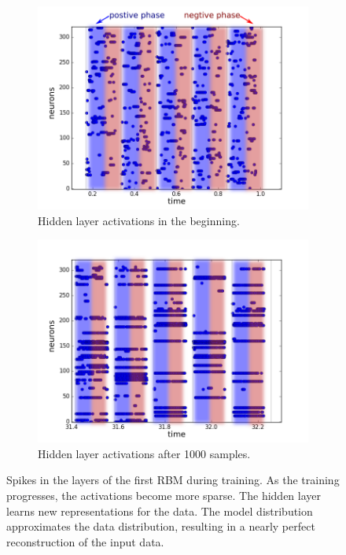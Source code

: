 \begin{figure}[h!]
	\begin{subfigure}[t]{.45\textwidth}
  		\centering
  		\includegraphics[width=.9\linewidth]{imgs/7x7/00006_h.png}
  		\caption{Hidden layer activations in the beginning.}
  		\label{fig:sub2}
	\end{subfigure}
	\begin{subfigure}[t]{.45\textwidth}
  		\centering
  		\includegraphics[width=.9\linewidth]{imgs/7x7/01992_h.png}
  		\caption{Hidden layer  activations after 1000 samples.}
  		\label{fig:sub2}
	\end{subfigure}
	\caption[Spikes in the layers of the first RBM during training.]{Spikes in the layers of the first RBM during training. As the training progresses, the activations become more sparse. The hidden layer learns new representations for the data. The model distribution approximates the data distribution, resulting in a nearly perfect reconstruction of the input data.}
	\label{fig:stripesspl1}
\end{figure}

